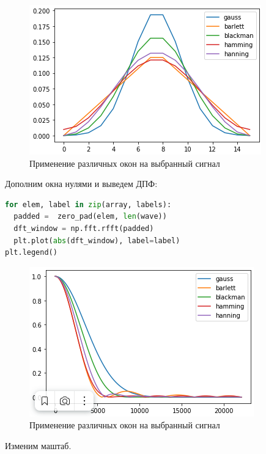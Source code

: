 \begin{figure}[H]
	\begin{center}
		\includegraphics[scale=1]{fig/lab08/lab8_8.png}
		\caption{Применение различных окон на выбранный сигнал}
	\end{center}
\end{figure}

Дополним окна нулями и выведем ДПФ:

\begin{lstlisting}[language=Python]
for elem, label in zip(array, labels):
  padded =  zero_pad(elem, len(wave))
  dft_window = np.fft.rfft(padded)
  plt.plot(abs(dft_window), label=label)
plt.legend()
\end{lstlisting}
\begin{figure}[H]
	\begin{center}
		\includegraphics[scale=1]{fig/lab08/lab8_9.png}
		\caption{Применение различных окон на выбранный сигнал}
	\end{center}
\end{figure}

Изменим маштаб.

